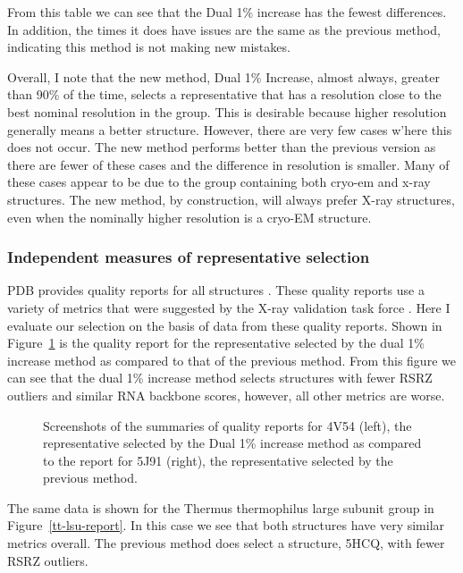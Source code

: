 From this table we can see that the Dual 1\% increase has the fewest differences.
In addition, the times it does have issues are the same as the previous method,
indicating this method is not making new mistakes.

Overall, I note that the new method, Dual 1\% Increase, almost always, greater
than 90\% of the time, selects a representative that has a resolution close to
the best nominal resolution in the group. This is desirable because higher
resolution generally means a better structure. However, there are very few cases
w’here this does not occur. The new method performs better than the previous
version as there are fewer of these cases and the difference in resolution is
smaller. Many of these cases appear to be due to the group containing both
cryo-em and x-ray structures. The new method, by construction, will always
prefer X-ray structures, even when the nominally higher resolution is a cryo-EM
structure.

\subsubsection{Independent measures of representative selection}

PDB provides quality reports for all structures \cite{Gore2012}. These quality
reports use a variety of metrics that were suggested by the X-ray validation
task force \cite{Gore2012}. Here I evaluate our selection on the basis of data
from these quality reports. Shown in Figure~\ref{fig:ec-lsu-report} is the
quality report for the representative selected by the dual 1\% increase method
as compared to that of the previous method. From this figure we can see that the
dual 1\% increase method selects structures with fewer RSRZ outliers and similar
RNA backbone scores, however, all other metrics are worse.

\begin{figure}
  \caption{Screenshots of the summaries of quality reports for 4V54 (left), the
    representative selected by the Dual 1\% increase method as compared to the
    report for 5J91 (right), the representative selected by the previous
  method.}
  \label{fig:ec-lsu-report}
\end{figure}

The same data is shown for the Thermus thermophilus large subunit group in
Figure~\ref{tt-lsu-report}. In this case we see that both structures have very
similar metrics overall. The previous method does select a structure, 5HCQ, with
fewer RSRZ outliers.

